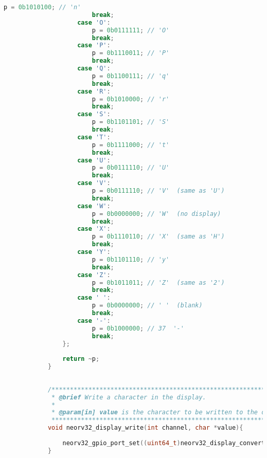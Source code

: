 \begin{lstlisting}[style=mystyle_c, language=c, breaklines]
                        p = 0b1010100; // 'n'
                        break;
                    case 'O':
                        p = 0b0111111; // 'O'
                        break;
                    case 'P':
                        p = 0b1110011; // 'P'
                        break;
                    case 'Q':
                        p = 0b1100111; // 'q'
                        break;
                    case 'R':
                        p = 0b1010000; // 'r'
                        break;
                    case 'S':
                        p = 0b1101101; // 'S'
                        break;
                    case 'T':
                        p = 0b1111000; // 't'
                        break;
                    case 'U':
                        p = 0b0111110; // 'U'
                        break;
                    case 'V':
                        p = 0b0111110; // 'V'  (same as 'U')
                        break;
                    case 'W':
                        p = 0b0000000; // 'W'  (no display)
                        break;
                    case 'X':
                        p = 0b1110110; // 'X'  (same as 'H')
                        break;
                    case 'Y':
                        p = 0b1101110; // 'y'
                        break;
                    case 'Z':
                        p = 0b1011011; // 'Z'  (same as '2')
                        break;
                    case ' ':
                        p = 0b0000000; // ' '  (blank)
                        break;
                    case '-':
                        p = 0b1000000; // 37  '-'  
                        break;
                };
            
                return ~p;
            }
            
            
            /************************************************************//**
             * @brief Write a character in the display.
             *
             * @param[in] value is the character to be written to the display.
             ***************************************************************/
            void neorv32_display_write(int channel, char *value){
                
                neorv32_gpio_port_set((uint64_t)neorv32_display_convert(value) <<  channel);
            }
        \end{lstlisting}
